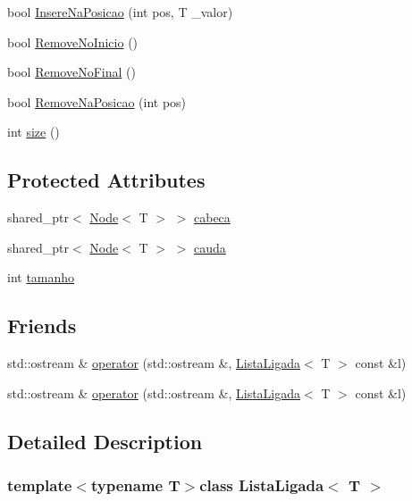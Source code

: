 \begin{DoxyCompactItemize}
\item 
bool \hyperlink{classListaLigada_ae42913bdf31cb66ab4a0eec0e207e843}{Insere\-Na\-Posicao} (int pos, T \-\_\-valor)
\item 
bool \hyperlink{classListaLigada_a96e263fe9ff0385719a67680d2d9eadc}{Remove\-No\-Inicio} ()
\item 
bool \hyperlink{classListaLigada_a48a1b9c8e883f6db2e0d68cfd18e0793}{Remove\-No\-Final} ()
\item 
bool \hyperlink{classListaLigada_a5e47ccba3363b97c6223d8867f18bbf7}{Remove\-Na\-Posicao} (int pos)
\item 
int \hyperlink{classListaLigada_aaa0fe8d3ea92daa521f97d5aa1936ae6}{size} ()
\end{DoxyCompactItemize}
\subsection*{Protected Attributes}
\begin{DoxyCompactItemize}
\item 
shared\-\_\-ptr$<$ \hyperlink{classNode}{Node}$<$ T $>$ $>$ \hyperlink{classListaLigada_a248027a0a05a7221fa718366db452fea}{cabeca}
\item 
shared\-\_\-ptr$<$ \hyperlink{classNode}{Node}$<$ T $>$ $>$ \hyperlink{classListaLigada_afb8bf9675df9229a9b03e41fe584fafa}{cauda}
\item 
int \hyperlink{classListaLigada_a7cb56d42e0603821e0b8f8645ec55ba0}{tamanho}
\end{DoxyCompactItemize}
\subsection*{Friends}
\begin{DoxyCompactItemize}
\item 
std\-::ostream \& \hyperlink{classListaLigada_a39cff4b79a3afa0ae93c15e24359f04c}{operator} (std\-::ostream \&, \hyperlink{classListaLigada}{Lista\-Ligada}$<$ T $>$ const \&l)
\item 
std\-::ostream \& \hyperlink{classListaLigada_a39cff4b79a3afa0ae93c15e24359f04c}{operator} (std\-::ostream \&, \hyperlink{classListaLigada}{Lista\-Ligada}$<$ T $>$ const \&l)
\end{DoxyCompactItemize}


\subsection{Detailed Description}
\subsubsection*{template$<$typename T$>$class Lista\-Ligada$<$ T $>$}

